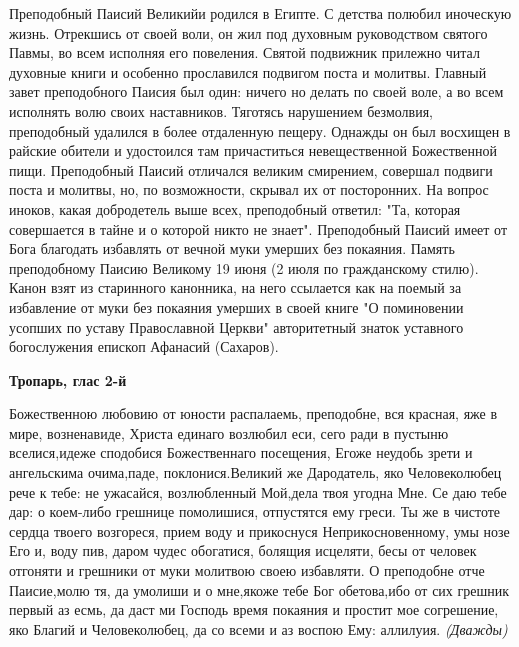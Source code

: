 




Преподобный Паисий Великийи родился в Египте. С детства полюбил иноческую жизнь. Отрекшись от своей воли, он жил под духовным руководством святого Павмы, во всем исполняя его повеления. Святой подвижник прилежно читал духовные книги и особенно прославился подвигом поста и молитвы. Главный завет преподобного Паисия был один:
ничего но делать по своей воле, а во всем исполнять волю своих наставников. Тяготясь нарушением безмолвия, преподобный удалился в более отдаленную пещеру. Однажды он был восхищен в райские обители и удостоился там причаститься невещественной Божественной пищи. Преподобный Паисий отличался великим смирением, совершал подвиги поста и молитвы, но, по возможности, скрывал их от посторонних. На вопрос иноков, какая добродетель выше всех, преподобный ответил: "Та, которая совершается в тайне и о которой никто не знает". Преподобный Паисий
имеет от Бога благодать избавлять от вечной муки умерших без покаяния. Память преподобному Паисию Великому 19 июня (2 июля по гражданскому стилю). Канон взят из старинного канонника, на него ссылается как на поемый за избавление от муки без покаяния умерших в своей книге "О поминовении усопших по уставу Православной Церкви" авторитетный знаток уставного богослужения епископ Афанасий (Сахаров).


\bfseries Тропарь, глас 2-й\normalfont{}


Божественною любовию от юности распалаемь, преподобне, вся красная, яже в мире, возненавиде, Христа единаго возлюбил еси, сего ради в пустыню вселися,идеже сподобися Божественнаго посещения, Егоже неудобь зрети и ангельскима очима,паде, поклонися.Великий же Дародатель, яко Человеко­любец рече к тебе: не ужасайся, возлюб­ленный Мой,дела твоя угодна Мне. Се даю тебе дар: о коем-либо грешнице помолишися, отпустятся ему греси. Ты же в чистоте сердца твоего возгореся, прием воду и прикоснуся Неприкосно­венному, умы нозе Его и, воду пив, да­ром чудес обогатися, болящия исцеляти, бесы от человек отгоняти и грешни­ки от муки молитвою своею избавляти. О преподобне отче Паисие,молю тя, да умолиши и о мне,якоже тебе Бог обетова,ибо от сих грешник первый аз есмь, да даст ми Господь время покаяния и простит мое согрешение, яко Благий и Человеколюбец, да со всеми и аз воспою Ему: аллилуия. \itshape (Дважды)\normalfont{}


